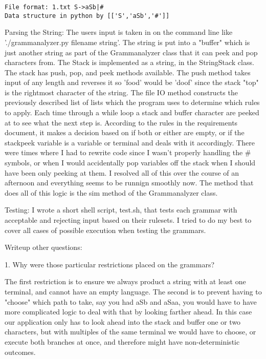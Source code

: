 \documentclass{article}
\begin{document}
\begin{lstlisting}
File format: 1.txt S->aSb|#
Data structure in python by [['S','aSb','#']]
\end{lstlisting}

Parsing the String: The users input is taken in on the command line like './grammanalyzer.py filename string'. The string is put into a "buffer" which is just another string as part of the Grammanalyzer class that it can peek and pop characters from. The Stack is implemented as a string, in the StringStack class. The stack has push, pop, and peek methods available. The push method takes input of any length and reverses it so 'food' would be 'doof' since the stack "top" is the rightmost character of the string. The file IO method constructs the previously described list of lists which the program uses to determine which rules to apply. Each time through a while loop a stack and buffer character are peeked at to see what the next step is. According to the rules in the requirements document, it makes a decision based on if both or either are empty, or if the stackpeek variable is a variable or terminal and deals with it accordingly. There were times where I had to rewrite code since I wasn't properly handling the \# symbols, or when I would accidentally pop variables off the stack when I should have been only peeking at them. I resolved all of this over the course of an afternoon and everything seems to be runnign smoothly now. The method that does all of this logic is the sim method of the Grammanalyzer class. 

Testing: I wrote a short shell script, test.sh, that tests each grammar with acceptable and rejecting input based on their rulesets. I tried to do my best to cover all cases of possible execution when testing the grammars. 

Writeup other questions:

1. Why were those particular restrictions placed on the grammars?

The first restriction is to ensure we always product a string with at least one terminal, and cannot have an empty language. The second is to prevent having to "choose" which path to take, say you had aSb and aSaa, you would have to have more complicated logic to deal with that by looking farther ahead. In this case our application only has to look ahead into the stack and buffer one or two characters, but with multiples of the same terminal we would have to choose, or execute both branches at once, and therefore might have non-deterministic outcomes.
\end{document}
